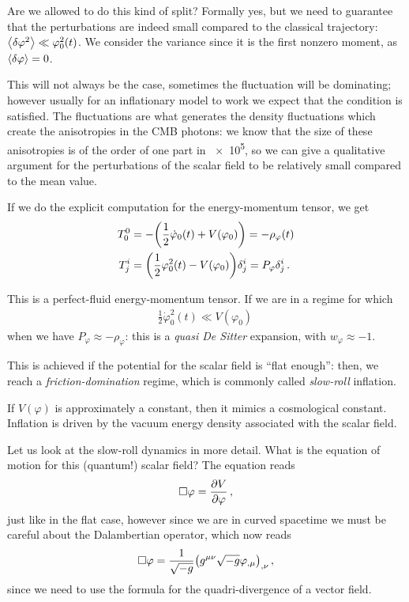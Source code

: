 \documentclass[main.tex]{subfiles}
\begin{document}
Are we allowed to do this kind of split?
Formally yes, but we need to guarantee that the perturbations are indeed small compared to the classical trajectory: \(\expval{ \delta \varphi^2} \ll \varphi_0^2 (t)\).
We consider the variance since it is the first nonzero moment, as \(\expval{ \delta \varphi }= 0\). 

This will not always be the case, sometimes the fluctuation will be dominating; however usually for an inflationary model to work we expect that the condition is satisfied.
The fluctuations are what generates the density fluctuations which create the anisotropies in the CMB photons: we know that the size of these anisotropies is of the order of one part in \num{e5}, so we can give a qualitative argument for the perturbations of the scalar field to be relatively small compared to the mean value. 

If we do the explicit computation for the energy-momentum tensor, we get 
%
\begin{align}
T^{0}_{0} &= - \qty( \frac{1}{2} \dot{\varphi}_0(t) + V(\varphi_0 )) = - \rho_\varphi (t)   \\
T^{i}_{j} &= \qty( \frac{1}{2} \varphi_0^2 (t) - V(\varphi_0 )) \delta^{i}_{j} = P_\varphi \delta^{i}_{j}
\,.
\end{align}

This is a perfect-fluid energy-momentum tensor. 
If we are in a regime for which 
%
\begin{align}
\frac{1}{2} \dot{\varphi}_0^2 (t) \ll V(\varphi_0 )
\,
\end{align}
%
when we have \(P_\varphi \approx - \rho _\varphi \): this is a \emph{quasi De Sitter} expansion, with \(w_\varphi \approx -1\). 

This is achieved if the potential for the scalar field is ``flat enough'': then, we reach a \emph{friction-domination} regime, which is commonly called \emph{slow-roll} inflation. 


If \(V(\varphi )\) is approximately a constant, then it mimics a cosmological constant. 
Inflation is driven by the vacuum energy density associated with the scalar field. 

Let us look at the slow-roll dynamics in more detail. 
What is the equation of motion for this (quantum!) scalar field? 
The equation reads 
%
\begin{align}
\square \varphi = \pdv{V}{\varphi }
\,,
\end{align}
%
just like in the flat case, however since we are in curved spacetime we must be careful about the Dalambertian operator, which now reads 
%
\begin{align}
\square \varphi = \frac{1}{\sqrt{-g}} \qty(g^{\mu \nu } \sqrt{-g} \varphi_{, \mu })_{, \nu }
\,,
\end{align}
%
since we need to use the formula for the quadri-divergence of a vector field. 
\end{document}
